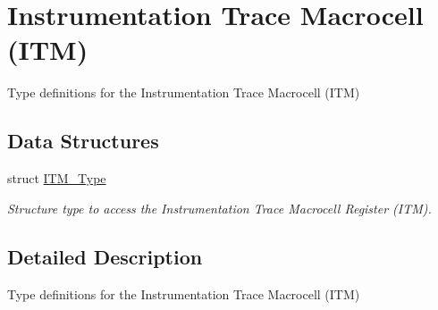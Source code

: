 \hypertarget{group___c_m_s_i_s___i_t_m}{\section{Instrumentation Trace Macrocell (I\-T\-M)}
\label{group___c_m_s_i_s___i_t_m}
}


Type definitions for the Instrumentation Trace Macrocell (I\-T\-M)  


\subsection*{Data Structures}
\begin{DoxyCompactItemize}
\item 
struct \hyperlink{struct_i_t_m___type}{I\-T\-M\-\_\-\-Type}
\begin{DoxyCompactList}\small\item\em Structure type to access the Instrumentation Trace Macrocell Register (I\-T\-M). \end{DoxyCompactList}\end{DoxyCompactItemize}


\subsection{Detailed Description}
Type definitions for the Instrumentation Trace Macrocell (I\-T\-M) 